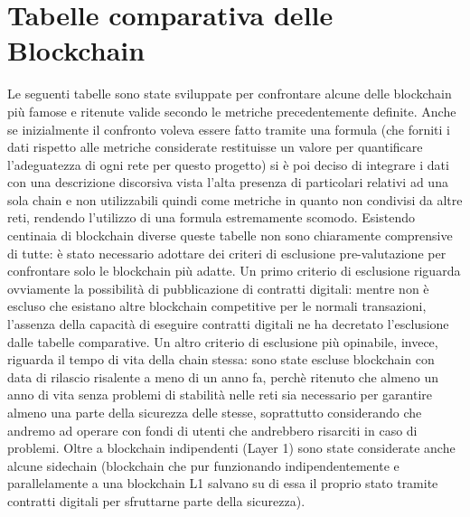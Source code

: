 \documentclass[a4paper, 12pt]{article}
\begin{document}
\section*{Tabelle comparativa delle Blockchain}
Le seguenti tabelle sono state sviluppate per confrontare alcune delle blockchain più famose e ritenute valide secondo le metriche precedentemente definite.
Anche se inizialmente il confronto voleva essere fatto tramite una formula (che forniti i dati rispetto alle metriche considerate restituisse un valore per quantificare l'adeguatezza di ogni rete per
questo progetto) si è poi deciso di integrare i dati con una descrizione discorsiva vista l'alta presenza di particolari relativi ad una sola chain e non utilizzabili quindi come metriche in quanto non condivisi da altre reti, rendendo l'utilizzo di una formula estremamente scomodo.
Esistendo centinaia di blockchain diverse queste tabelle non sono chiaramente comprensive di tutte: è stato necessario adottare dei criteri di esclusione pre-valutazione per confrontare
solo le blockchain più adatte.
Un primo criterio di esclusione riguarda ovviamente la possibilità di pubblicazione di contratti digitali: mentre non è escluso che esistano altre blockchain competitive
per le normali transazioni, l'assenza della capacità di eseguire contratti digitali ne ha decretato l'esclusione dalle tabelle comparative.
Un altro criterio di esclusione più opinabile, invece, riguarda il tempo di vita della chain stessa: sono state escluse blockchain con data di rilascio risalente a meno di un anno fa,
perchè ritenuto che almeno un anno di vita senza problemi di stabilità nelle reti sia necessario per garantire almeno una parte della sicurezza delle stesse, soprattutto
considerando che andremo ad operare con fondi di utenti che andrebbero risarciti in caso di problemi.
Oltre a blockchain indipendenti (Layer 1) sono state considerate anche alcune sidechain (blockchain che pur funzionando indipendentemente e parallelamente a una blockchain L1 salvano su di essa il proprio stato tramite contratti digitali per sfruttarne parte della sicurezza).

\renewcommand\arraystretch{1.6}
\end{document}
